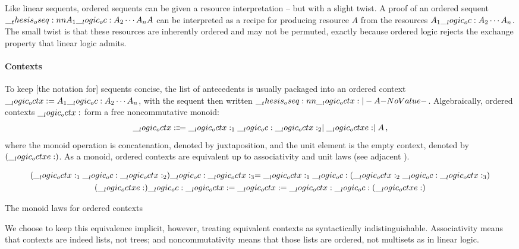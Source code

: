 Like linear sequents\autocite{Girard:TCS87}, ordered sequents can be given a resource interpretation -- but with a slight twist.
A proof of an ordered sequent
$\oseq{A_1 \oc A_2 \dotsb A_n |- A}$
can be interpreted as a recipe for producing resource $A$ from the resources $A_1 \__logic_oc: A_2 \dotsb A_n$.
The small twist is that these resources are inherently ordered and may not be permuted, exactly because ordered logic rejects the exchange property that linear logic admits.

\paragraph{Contexts}
To keep [the notation for] sequents concise, the list of antecedents is usually packaged into an ordered context $\__logic_octx: = A_1 \__logic_oc: A_2 \dotsb A_n$, with the sequent then written $\oseq{\octx |- A}$.
Algebraically, ordered contexts $\__logic_octx:$ form a free noncommutative monoid:
\begin{equation*}
  \__logic_octx: \Coloneqq \__logic_octx:_1 \__logic_oc: \__logic_octx:_2 \mid \__logic_octxe: \mid A \,,
\end{equation*}
where the monoid operation is concatenation, denoted by juxtaposition, and the unit element is the empty context, denoted by $(\__logic_octxe:)$.
As a monoid, ordered contexts are equivalent up to associativity and unit laws (see adjacent ).%
\begin{marginfigure}
  \begin{gather*}
    (\__logic_octx:_1 \__logic_oc: \__logic_octx:_2) \__logic_oc: \__logic_octx:_3 = \__logic_octx:_1 \__logic_oc: (\__logic_octx:_2 \__logic_oc: \__logic_octx:_3) \\
    (\__logic_octxe:) \__logic_oc: \__logic_octx: = \__logic_octx: = \__logic_octx: \__logic_oc: (\__logic_octxe:)
  \end{gather*}
  \caption{The monoid laws for ordered contexts}\label{fig:ordered-logic:monoid-laws}
\end{marginfigure}
We choose to keep this equivalence implicit, however, treating equivalent contexts as syntactically indistinguishable.
%
Associativity means that contexts are indeed lists, not trees; and noncommutativity means that those lists are ordered, not multisets as in linear logic.




